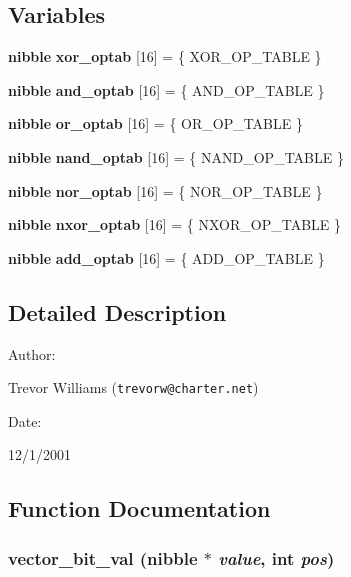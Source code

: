 \subsection*{Variables}
\begin{CompactItemize}
\item 
{\bf nibble} {\bf xor\_\-optab} [16] = \{ XOR\_\-OP\_\-TABLE \}
\item 
{\bf nibble} {\bf and\_\-optab} [16] = \{ AND\_\-OP\_\-TABLE \}
\item 
{\bf nibble} {\bf or\_\-optab} [16] = \{ OR\_\-OP\_\-TABLE \}
\item 
{\bf nibble} {\bf nand\_\-optab} [16] = \{ NAND\_\-OP\_\-TABLE \}
\item 
{\bf nibble} {\bf nor\_\-optab} [16] = \{ NOR\_\-OP\_\-TABLE \}
\item 
{\bf nibble} {\bf nxor\_\-optab} [16] = \{ NXOR\_\-OP\_\-TABLE \}
\item 
{\bf nibble} {\bf add\_\-optab} [16] = \{ ADD\_\-OP\_\-TABLE \}
\end{CompactItemize}


\subsection{Detailed Description}


\begin{Desc}
\item[Author: ]\par
Trevor Williams ({\tt trevorw@charter.net}) \end{Desc}
\begin{Desc}
\item[Date: ]\par
12/1/2001\end{Desc}


\subsection{Function Documentation}
\subsubsection{ vector\_\-bit\_\-val ({\bf nibble} $\ast$ {\em value}, int {\em pos})}\label{vector_8c_a16}


